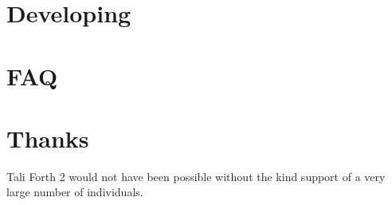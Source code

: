 \documentclass[a4paper,notitlepage]{report}
\begin{document}
\chapter{Developing}
        




\appendix

\chapter{FAQ}
        

\chapter{Thanks}
Tali Forth 2 would not have been possible without the kind support of a very
large number of individuals.

\begin{theindex}
\end{theindex}
\end{document}
